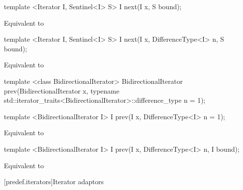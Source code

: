 \begin{addedblock}
\begin{itemdecl}
template <Iterator I, Sentinel<I> S>
  I next(I x, S bound);
\end{itemdecl}

\begin{itemdescr}
\pnum
\effects Equivalent to 
\end{itemdescr}

\begin{itemdecl}
template <Iterator I, Sentinel<I> S>
  I next(I x, DifferenceType<I> n, S bound);
\end{itemdecl}

\begin{itemdescr}
\pnum
\effects Equivalent to 
\end{itemdescr}
\end{addedblock}

%
\begin{removedblock}
\begin{itemdecl}
template <class BidirectionalIterator>
  BidirectionalIterator prev(BidirectionalIterator x,
    typename std::iterator_traits<BidirectionalIterator>::difference_type n = 1);
\end{itemdecl}
\end{removedblock}
\begin{addedblock}
\begin{itemdecl}
template <BidirectionalIterator I>
  I prev(I x, DifferenceType<I> n = 1);
\end{itemdecl}
\end{addedblock}

\begin{itemdescr}
\pnum
\effects Equivalent to 
\end{itemdescr}

\begin{addedblock}
\begin{itemdecl}
template <BidirectionalIterator I>
  I prev(I x, DifferenceType<I> n, I bound);
\end{itemdecl}

\begin{itemdescr}
\pnum
\effects Equivalent to 
\end{itemdescr}
\end{addedblock}

[predef.iterators]{Iterator adaptors}

